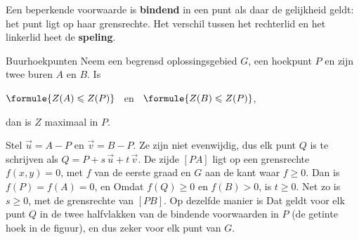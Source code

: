 \begin{theorie}
Een beperkende voorwaarde is \textbf{\textcolor{accent}{bindend}} in een punt als daar de gelijkheid geldt: het punt ligt op haar grensrechte. Het verschil tussen het rechterlid en het linkerlid heet de \textbf{\textcolor{accent}{speling}}.

\begin{minipage}[t]{.64\linewidth}
\vspace{0pt}
\begin{stelling}{Buurhoekpunten}
Neem een begrensd oplossingsgebied $G$, een hoekpunt $P$ en zijn twee buren $A$ en $B$. Is

\vspace{1mm}
\qquad $\formule{Z(A) \leqslant Z(P)}$ \ en \ $\formule{Z(B) \leqslant Z(P)}$,

\vspace{1mm}
dan is $Z$ maximaal in $P$.
\end{stelling}
\end{minipage}\hfill
\begin{minipage}[t]{.32\linewidth}
\vspace{0pt}
\centering
{}
\end{minipage}

\begin{bewijs}
Stel $\vec u = A - P$ en $\vec v = B - P$. Ze zijn niet evenwijdig, dus elk punt $Q$ is te schrijven als $Q = P + s\,\vec u + t\,\vec v$. De zijde $[PA]$ ligt op een grensrechte $f(x, y) = 0$, met $f$ van de eerste graad en $G$ aan de kant waar $f \geqslant 0$. Dan is $f(P) = f(A) = 0$, en
Omdat $f(Q) \geqslant 0$ en $f(B) > 0$, is $t \geqslant 0$. Net zo is $s \geqslant 0$, met de grensrechte van $[PB]$. Op dezelfde manier is
Dat geldt voor elk punt $Q$ in de twee halfvlakken van de bindende voorwaarden in $P$ (de getinte hoek in de figuur), en dus zeker voor elk punt van $G$.
\end{bewijs}
\end{theorie}

